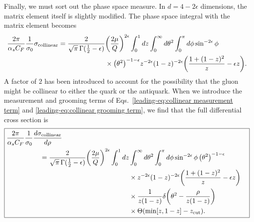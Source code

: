 \documentclass[../thesis.tex]{subfiles}
\providecommand{\zcut}{z_\mathrm{{cut}}}
\begin{document}
	Finally, we must sort out the phase space measure. In $d = 4 - 2\epsilon$ dimensions, the matrix element itself is slightly modified. The phase space integral with the matrix element becomes \cite{ellis_qcd_1996}
	\begin{equation}
	\begin{aligned}
		\frac{2\pi}{\alpha_s C_F} \frac{1}{\sigma_0}\sigma_{\text{collinear}} = \frac{2}{\sqrt{\pi}\,\Gamma(\frac{1}{2} - \epsilon)} &\qty(\frac{2\mu}{Q})^{2\epsilon} \int_0^1 dz \int_0^\infty d\theta^2 \int_0^{\pi} d\phi \sin^{-2\epsilon}\phi  \\
			&\times \qty(\theta^2)^{-1-\epsilon} z^{-2\epsilon} (1 - z)^{-2\epsilon} \qty(\frac{1 + (1 - z)^2}{z} - \epsilon z).
	\end{aligned}
	\end{equation}
	A factor of $2$ has been introduced to account for the possibility that the gluon might be collinear to either the quark or the antiquark. When we introduce the measurement and grooming terms of Eqs.~\ref{leading-eq:collinear measurement term} and \ref{leading-eq:collinear grooming term}, we find that the full differential cross section is
	\begin{equation}\label{leading-eq:collinear integral}
	\boxed{
	\begin{aligned}
		\frac{2\pi}{\alpha_s C_F} \frac{1}{\sigma_0}\frac{d\sigma_{\text{collinear}}}{d\rho}\hspace{3.5cm} \\
		= \frac{2}{\sqrt{\pi}\,\Gamma(\frac{1}{2} - \epsilon)} \qty(\frac{2\mu}{Q})^{2\epsilon} \int_0^1 dz &\int_0^\infty d\theta^2 \int_0^{\pi} d\phi \sin^{-2\epsilon}\phi\,\qty(\theta^2)^{-1-\epsilon} \\
			&\times  z^{-2\epsilon} (1 - z)^{-2\epsilon} \qty(\frac{1 + (1 - z)^2}{z} - \epsilon z)\\
			&\times \frac{1}{z(1 - z)}\delta\qty(\theta^2 - \frac{\rho}{z(1 - z)}) \\
			&\times\Theta\qty(\min[z, 1 - z] - \zcut).
	\end{aligned}
	}
	\end{equation}
\end{document}
